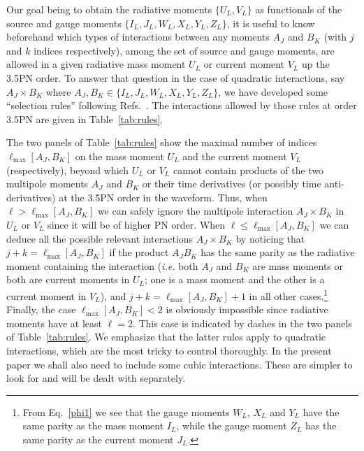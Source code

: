 \documentclass[prd,preprint,superscriptaddress,tightenlines,nofootinbib,
  eqsecnum,showpacs]{revtex4}
\begin{document}
Our goal being to obtain the radiative moments $\{U_L, V_L\}$ as
functionals of the source and gauge moments $\{I_L, J_L, W_L, X_L,
Y_L, Z_L\}$, it is useful to know beforehand which types of
interactions between any moments $A_J$ and $B_K$ (with $j$ and $k$
indices respectively), among the set of source and gauge moments, are
allowed in a given radiative mass moment $U_L$ or current moment $V_L$
up the 3.5PN order. To answer that question in the case of quadratic
interactions, say $A_J\times B_K$ where $A_J, B_K \in \{I_L, J_L, W_L,
X_L, Y_L, Z_L\}$, we have developed some ``selection rules'' following
Refs.~\cite{BFIS08, FMBI12}. The interactions allowed by those rules
at order 3.5PN are given in Table~\ref{tab:rules}.

The two panels of Table~\ref{tab:rules} show the maximal number of
indices $\ell_\text{max}[A_J, B_K]$ on the mass moment $U_L$ and the
current moment $V_{L}$ (respectively), beyond which $U_L$ or $V_L$
cannot contain products of the two multipole moments $A_J$ and $B_K$
or their time derivatives (or possibly time anti-derivatives) at the
3.5PN order in the waveform. Thus, when $\ell>\ell_\text{max}[A_J,
  B_K]$ we can safely ignore the multipole interaction $A_J\times B_K$
in $U_L$ or $V_L$ since it will be of higher PN order. When
$\ell\leqslant\ell_\text{max}[A_J, B_K]$ we can deduce all the
possible relevant interactions $A_J\times B_K$ by noticing that
$j+k=\ell_\text{max}[A_J, B_K]$ if the product $A_J B_K$ has the same
parity as the radiative moment containing the interaction
(\textit{i.e.} both $A_J$ and $B_K$ are mass moments or both are
current moments in $U_L$; one is a mass moment and the other is a
current moment in $V_L$), and $j+k=\ell_\text{max}[A_J, B_K]+1$ in all
other cases.\footnote{From Eq.~\eqref{phi1} we see that the gauge
  moments $W_L$, $X_L$ and $Y_L$ have the same parity as the mass
  moment $I_L$, while the gauge moment $Z_L$ has the same parity as
  the current moment $J_L$.} Finally, the case $\ell_\text{max}[A_J,
  B_K]<2$ is obviously impossible since radiative moments have at
least $\ell=2$. This case is indicated by dashes in the two panels of
Table~\ref{tab:rules}. We emphasize that the latter rules apply to
quadratic interactions, which are the most tricky to control
thoroughly. In the present paper we shall also need to include some
cubic interactions. These are simpler to look for and will be dealt
with separately.
%
\end{document}
